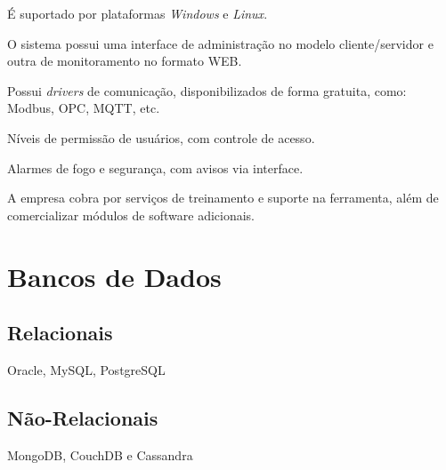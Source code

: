     \begin{alineascomponto}
        \item É suportado por plataformas \textit{Windows} e \textit{Linux}.
	    \item O sistema possui uma interface de administração no modelo cliente/servidor e outra de monitoramento no formato \gls{WEB}.
	    \item Possui \textit{drivers} de comunicação, disponibilizados de forma gratuita, como: Modbus, \gls{OPC}, \gls{MQTT}, etc.
	    \item Níveis de permissão de usuários, com controle de acesso.
	    \item Alarmes de fogo e segurança, com avisos via interface.
	    \item A empresa cobra por serviços de treinamento e suporte na ferramenta, além de comercializar módulos de software adicionais.
    \end{alineascomponto}
    
\section{Bancos de Dados}
\label{sec:bancos-de-dados}

    \subsection{Relacionais}
    \label{sec:bancos-de-dados-relacionais}
        Oracle, MySQL, PostgreSQL
    
    \subsection{Não-Relacionais}
    \label{sec:bancos-de-dados-relacionais}
    \cite{cattell2011scalable}
    
        MongoDB, CouchDB e Cassandra